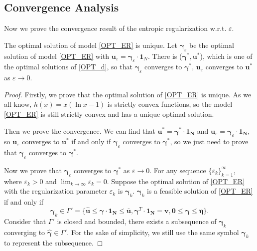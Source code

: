 \documentclass[review,hidelinks,onefignum,onetabnum]{siamart220329}
\begin{document}
\subsection{Convergence Analysis}
Now we prove the convergence result of the entropic regularization w.r.t. $\varepsilon$.
\begin{theorem}
	The optimal solution of model \cref{OPT_ER} is unique. Let $\bm{\gamma}_{\varepsilon}$ be the optimal solution of model \cref{OPT_ER} with $\bm{u}_{\varepsilon}=\bm{\gamma}_{\varepsilon}\cdot \bm{1}_{N}$. There is ($\bm{\gamma}^*,\bm{ u}^*$), which is one of the optimal solutions of \cref{OPT_d}, so that $\bm{\gamma}_{\varepsilon}$ converges to $\bm{\gamma}^*$, $\bm{u}_{\varepsilon}$ converges to $\bm{u}^*$ as $\varepsilon\rightarrow 0$.
\end{theorem}
\begin{proof}
Firstly, we prove that the optimal solution of \cref{OPT_ER} is unique. As we all know, $h(x)=x(\ln x-1)$ is strictly convex functions, so the model \cref{OPT_ER} is still strictly convex and has a unique optimal solution.

 Then we prove the convergence. We can find that $\bm{u}^*=\bm{\gamma}^*\cdot \bm{1_{N}}$ and $\bm{u}_{\varepsilon}=\bm{\gamma}_{\varepsilon}\cdot \bm{1_{N}}$, so $\bm{u}_{\varepsilon}$ converges to $\bm{u}^*$ if and only if $\bm{\gamma}_{\varepsilon}$ converges to $\bm{\gamma}^*$,
 so we just need to prove that $\bm{\gamma}_{\varepsilon}$ converges to $\bm{\gamma}^*$.
 
 Now we prove that $\bm{\gamma}_{\varepsilon}$ converges to $\bm{\gamma}^*$ as $\varepsilon\rightarrow 0$.
 For any sequence $\{\varepsilon_k\}_{k=1}^{\infty}$, where $\varepsilon_k>0$ and $\lim_{k\rightarrow \infty} \varepsilon_k=0$. Suppose the optimal solution of \cref{OPT_ER} with the regularization parameter $\varepsilon_k$ is $\bm{\gamma}_k$.
 $\bm{\gamma}_k$ is a feasible solution of \cref{OPT_ER} if and only if 
 $$\bm{\gamma}_k \in \Gamma'=\{\bm{\hat{u}}\leq \bm{\gamma}\cdot \bm{1_{N}} \leq  \bm{\overline{u}}, \bm{\gamma}^{T}\cdot \bm{1_{N}}=\bm{v}, \bm{0}\leq \bm{\gamma} \leq \bm{\eta}\}.$$ 
 Consider that $\Gamma'$ is closed and bounded, there exists a subsequence of $\bm{\gamma}_k$ converging to $\hat{\bm{\gamma}}\in \Gamma'$. For the sake of simplicity, we still use the same symbol $\bm{\gamma}_k$ to represent the subsequence.
 

\end{proof}
\end{document}

